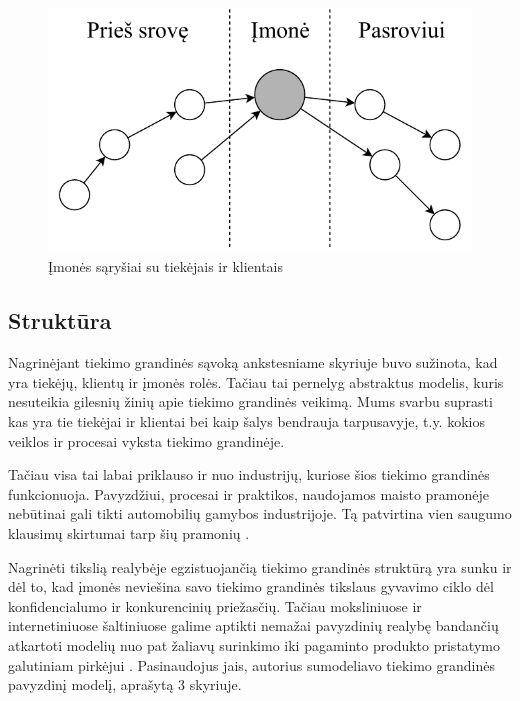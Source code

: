 \begin{figure}[H]
    \centering
    \includegraphics[scale=0.8]{images/supply-chain-upstream-downstream}
    \caption{Įmonės sąryšiai su tiekėjais ir klientais}
\end{figure}




\subsection{Struktūra}

Nagrinėjant tiekimo grandinės sąvoką ankstesniame skyriuje buvo sužinota, kad yra tiekėjų, klientų ir įmonės rolės. Tačiau tai pernelyg abstraktus modelis, kuris nesuteikia gilesnių žinių apie tiekimo grandinės veikimą. Mums svarbu suprasti kas yra tie tiekėjai ir klientai bei kaip šalys bendrauja tarpusavyje, t.y. kokios veiklos ir procesai vyksta tiekimo grandinėje. 

Tačiau visa tai labai priklauso ir nuo industrijų, kuriose šios tiekimo grandinės funkcionuoja. Pavyzdžiui, procesai ir praktikos, naudojamos maisto pramonėje nebūtinai gali tikti automobilių gamybos industrijoje. Tą patvirtina vien saugumo klausimų skirtumai tarp šių pramonių \cite{marucheck2011product}.

Nagrinėti tikslią realybėje egzistuojančią tiekimo grandinės struktūrą yra sunku ir dėl to, kad įmonės neviešina savo tiekimo grandinės tikslaus gyvavimo ciklo dėl konfidencialumo ir konkurencinių priežasčių. Tačiau moksliniuose ir internetiniuose šaltiniuose galime aptikti nemažai pavyzdinių realybę bandančių atkartoti modelių nuo pat žaliavų surinkimo iki pagaminto produkto pristatymo galutiniam pirkėjui \cite{christopher2016logistics} \cite{webber2009building} \cite{patrick2017continuous} \cite{justin2016customer}. Pasinaudojus jais, autorius sumodeliavo tiekimo grandinės pavyzdinį modelį, aprašytą 3 skyriuje.

